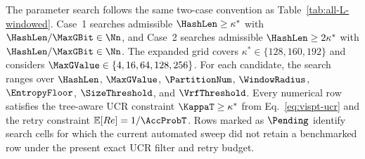 The parameter search follows the same two-case convention as
Table~\ref{tab:all-L-windowed}. Case~1 searches admissible
$\HashLen\ge\kappa^{*}$ with $\HashLen/\MaxGBit\in\Nn$, and Case~2 searches
admissible $\HashLen\ge2\kappa^{*}$ with
$\HashLen/\MaxGBit\in\Nn$. The expanded grid covers
$\kappa^{*}\in\{128,160,192\}$ and considers
$\MaxGValue\in\{4,16,64,128,256\}$. For each candidate, the search ranges over
$\HashLen$, $\MaxGValue$, $\PartitionNum$, $\WindowRadius$, $\EntropyFloor$,
$\SizeThreshold$, and $\VrfThreshold$. Every numerical row satisfies the
tree-aware UCR constraint $\KappaT\ge\kappa^{*}$ from
Eq.~\eqref{eq:vispt-ucr} and the retry constraint
$\mathbb E[Re]=1/\AccProbT$. Rows marked as $\Pending$ identify search cells
for which the current automated sweep did not retain a benchmarked row under
the present exact UCR filter and retry budget.

